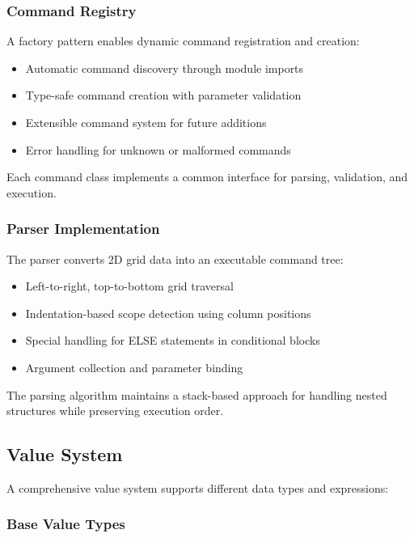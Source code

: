 \subsubsection{Command Registry}

A factory pattern enables dynamic command registration and creation:

\begin{itemize}
    \item Automatic command discovery through module imports
    \item Type-safe command creation with parameter validation
    \item Extensible command system for future additions
    \item Error handling for unknown or malformed commands
\end{itemize}

Each command class implements a common interface for parsing, validation, and execution.

\subsubsection{Parser Implementation}

The parser converts 2D grid data into an executable command tree:

\begin{itemize}
    \item Left-to-right, top-to-bottom grid traversal
    \item Indentation-based scope detection using column positions
    \item Special handling for ELSE statements in conditional blocks
    \item Argument collection and parameter binding
\end{itemize}

The parsing algorithm maintains a stack-based approach for handling nested structures while preserving execution order.

\subsection{Value System}

A comprehensive value system supports different data types and expressions:

\subsubsection{Base Value Types}

